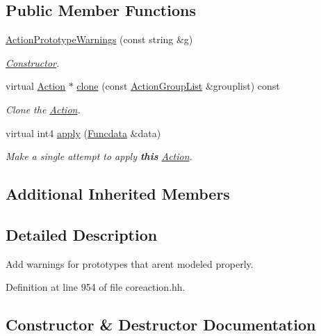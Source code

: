 \subsection*{Public Member Functions}
\begin{DoxyCompactItemize}
\item 
\mbox{\hyperlink{class_action_prototype_warnings_ab64278c34e15df9a8f1fdbe74ab10034}{Action\+Prototype\+Warnings}} (const string \&g)
\begin{DoxyCompactList}\small\item\em \mbox{\hyperlink{class_constructor}{Constructor}}. \end{DoxyCompactList}\item 
virtual \mbox{\hyperlink{class_action}{Action}} $\ast$ \mbox{\hyperlink{class_action_prototype_warnings_afe5d4ac774bbeb80c6be7bcdc2578de5}{clone}} (const \mbox{\hyperlink{class_action_group_list}{Action\+Group\+List}} \&grouplist) const
\begin{DoxyCompactList}\small\item\em Clone the \mbox{\hyperlink{class_action}{Action}}. \end{DoxyCompactList}\item 
virtual int4 \mbox{\hyperlink{class_action_prototype_warnings_a6f52b3f6147c5baac2d7a27c90234001}{apply}} (\mbox{\hyperlink{class_funcdata}{Funcdata}} \&data)
\begin{DoxyCompactList}\small\item\em Make a single attempt to apply {\bfseries{this}} \mbox{\hyperlink{class_action}{Action}}. \end{DoxyCompactList}\end{DoxyCompactItemize}
\subsection*{Additional Inherited Members}


\subsection{Detailed Description}
Add warnings for prototypes that aren\textquotesingle{}t modeled properly. 

Definition at line 954 of file coreaction.\+hh.



\subsection{Constructor \& Destructor Documentation}
\mbox{\label{class_action_prototype_warnings_ab64278c34e15df9a8f1fdbe74ab10034}} 
